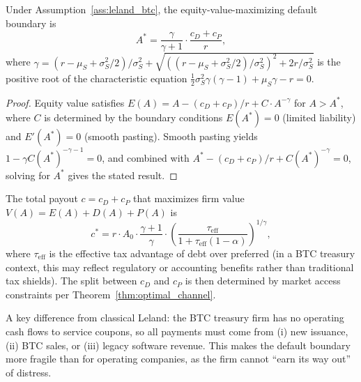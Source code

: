 \begin{theorem}\label{thm:default_boundary}
Under Assumption~\ref{ass:leland_btc}, the equity-value-maximizing default
boundary is
\begin{equation}\label{eq:A_star}
  A^* = \frac{\gamma}{\gamma + 1} \cdot \frac{c_D + c_P}{r},
\end{equation}
where $\gamma = (r - \mu_S + \sigma_S^2/2) / \sigma_S^2
+ \sqrt{((r - \mu_S + \sigma_S^2/2)/\sigma_S^2)^2 + 2r/\sigma_S^2}$
is the positive root of the characteristic equation
$\tfrac{1}{2}\sigma_S^2 \gamma(\gamma-1) + \mu_S \gamma - r = 0$.
\end{theorem}

\begin{proof}
Equity value satisfies $E(A) = A - (c_D + c_P)/r + C \cdot A^{-\gamma}$
for $A > A^*$, where $C$ is determined by the boundary conditions
$E(A^*) = 0$ (limited liability) and $E'(A^*) = 0$ (smooth pasting).
Smooth pasting yields
$1 - \gamma C (A^*)^{-\gamma-1} = 0$, and combined with
$A^* - (c_D+c_P)/r + C(A^*)^{-\gamma} = 0$, solving for $A^*$ gives
the stated result.
\end{proof}

\begin{corollary}\label{cor:optimal_split}
The total payout $c = c_D + c_P$ that maximizes firm value
$V(A) = E(A) + D(A) + P(A)$ is
\begin{equation}\label{eq:optimal_c}
  c^* = r \cdot A_0 \cdot \frac{\gamma + 1}{\gamma}
    \cdot \left(\frac{\tau_{\mathrm{eff}}}{1 + \tau_{\mathrm{eff}}
    (1-\alpha)}\right)^{1/\gamma},
\end{equation}
where $\tau_{\mathrm{eff}}$ is the effective tax advantage of
debt over preferred (in a BTC treasury context, this may reflect
regulatory or accounting benefits rather than traditional tax shields).
The split between $c_D$ and $c_P$ is then determined by market access
constraints per Theorem~\ref{thm:optimal_channel}.
\end{corollary}

\begin{remark}
A key difference from classical Leland: the BTC treasury firm has no
operating cash flows to service coupons, so all payments must come from
(i) new issuance, (ii) BTC sales, or (iii) legacy software revenue.
This makes the default boundary more fragile than for operating companies,
as the firm cannot ``earn its way out'' of distress.
\end{remark}
